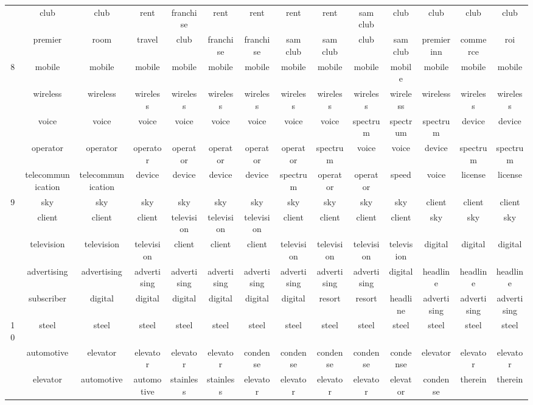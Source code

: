 \documentclass[12pt,journal,letterpaper,oneside,onecolumn]{IEEEtran}
\begin{document}
\begin{center}
{\begin{tabular}{c|c|c|c|c|c|c|c|c|c|c|c|c|c}
         & club & club & rent & franchise & rent & rent & rent & rent & sam club & club & club & club & club \\ 
         & premier & room & travel & club & franchise & franchise & sam club & sam club & club & sam club & premier inn & commerce & roi \\ 
        \hline
        8 & mobile & mobile & mobile & mobile & mobile & mobile & mobile & mobile & mobile & mobile & mobile & mobile & mobile \\ 
         & wireless & wireless & wireless & wireless & wireless & wireless & wireless & wireless & wireless & wireless & wireless & wireless & wireless \\ 
         & voice & voice & voice & voice & voice & voice & voice & voice & spectrum & spectrum & spectrum & device & device \\ 
         & operator & operator & operator & operator & operator & operator & operator & spectrum & voice & voice & device & spectrum & spectrum \\ 
         & telecommunication & telecommunication & device & device & device & device & spectrum & operator & operator & speed & voice & license & license \\ 
        \hline
        9 & sky & sky & sky & sky & sky & sky & sky & sky & sky & sky & client & client & client \\ 
         & client & client & client & television & television & television & client & client & client & client & sky & sky & sky \\ 
         & television & television & television & client & client & client & television & television & television & television & digital & digital & digital \\ 
         & advertising & advertising & advertising & advertising & advertising & advertising & advertising & advertising & advertising & digital & headline & headline & headline \\ 
         & subscriber & digital & digital & digital & digital & digital & digital & resort & resort & headline & advertising & advertising & advertising \\ 
        \hline
        10 & steel & steel & steel & steel & steel & steel & steel & steel & steel & steel & steel & steel & steel \\ 
         & automotive & elevator & elevator & elevator & elevator & condense & condense & condense & condense & condense & elevator & elevator & elevator \\ 
         & elevator & automotive & automotive & stainless & stainless & elevator & elevator & elevator & elevator & elevator & condense & therein & therein \\ 

\end{tabular}}
\end{center}
\end{document}
